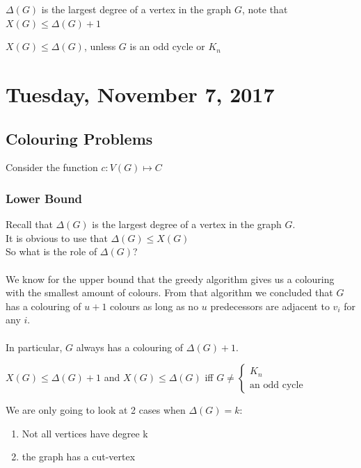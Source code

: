 \documentclass[12pt]{article}
\begin{document}
\begin{tcolorbox}[title=Definition: Largest degree of a vertex in the graph $G$]
	$\Delta (G)$ is the largest degree of a vertex in the graph $G$, note that $X(G) \leq \Delta (G) + 1$
\end{tcolorbox}

\begin{tcolorbox}[title=Brook's Theorem]
	$X(G) \leq \Delta (G)$, unless $G$ is an odd cycle or $K_n$
\end{tcolorbox}

\newpage

\section{Tuesday, November 7, 2017}

\subsection{Colouring Problems}

Consider the function $c: V(G) \mapsto C$

\subsubsection{Lower Bound}

Recall that $\Delta (G)$ is the largest degree of a vertex in the graph $G$.\\
It is obvious to use that $\Delta (G) \leq X(G)$\\
So what is the role of $\Delta (G)$?\\
\\
We know for the upper bound that the greedy algorithm gives us a colouring with the smallest amount of colours. From that algorithm we concluded that $G$ has a colouring of $u+1$ colours as long as no $u$ predecessors are adjacent to $v_i$ for any $i$.\\
\\
In particular, $G$ always has a colouring of $\Delta (G) + 1$.
\begin{tcolorbox}[title=Brooke's Theorem]
	$X(G) \leq \Delta (G) + 1$ and $X(G) \leq \Delta (G)$ iff $G\neq \begin{cases}
		K_n\\
		\text{an odd cycle}
	\end{cases}
$
\end{tcolorbox}

We are only going to look at 2 cases when $\Delta (G) = k$:
\begin{enumerate}
	\item{Not all vertices have degree k}
	\item{the graph has a cut-vertex}
\end{enumerate}
\end{document}
